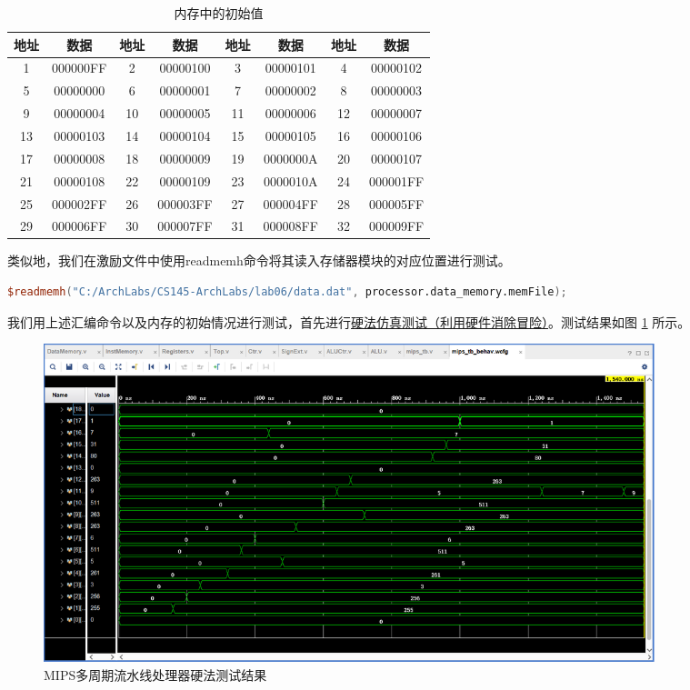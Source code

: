 \documentclass{cumcm}
\numberwithin{equation}{section}
\numberwithin{equation}{subsection}
\begin{document}
\begin{table}[htbp]
    \centering
    \begin{tabular}{|c|c|c|c|c|c|c|c|}
        \hline
        地址 & 数据 & 地址 & 数据& 地址 & 数据 & 地址 & 数据\\ \hline
        1 & 000000FF & 
        2 & 00000100 &
        3 & 00000101 & 
        4 & 00000102\\
        5 & 00000000 &
        6 & 00000001 &
        7 & 00000002 &
        8 & 00000003\\
        9 & 00000004 &
        10 & 00000005 &
        11 & 00000006 &
        12 & 00000007\\
        13 & 00000103 &
        14 & 00000104 &
        15 & 00000105 &
        16 & 00000106\\
        17 & 00000008 &
        18 & 00000009 &
        19 & 0000000A &
        20 & 00000107\\
        21 & 00000108 &
        22 & 00000109 &
        23 & 0000010A &
        24 & 000001FF\\
        25 & 000002FF &
        26 & 000003FF &
        27 & 000004FF &
        28 & 000005FF\\
        29 & 000006FF &
        30 & 000007FF &
        31 & 000008FF &
        32 & 000009FF\\
        \hline
    \end{tabular}
    \caption{内存中的初始值}
    \label{tab4}
\end{table}

类似地，我们在激励文件中使用readmemh命令将其读入存储器模块的对应位置进行测试。
\begin{lstlisting}[language=verilog]
$readmemh("C:/ArchLabs/CS145-ArchLabs/lab06/data.dat", processor.data_memory.memFile);         
\end{lstlisting}

我们用上述汇编命令以及内存的初始情况进行测试，首先进行\underline{硬法仿真测试（利用硬件消除冒险）}。测试结果如图 \ref{fig1} 所示。

\begin{figure}[htbp]
    \centering
    \includegraphics[width=7in]{1.png}
    \caption{MIPS多周期流水线处理器硬法测试结果}
    \label{fig1}
\end{figure}
\end{document}
